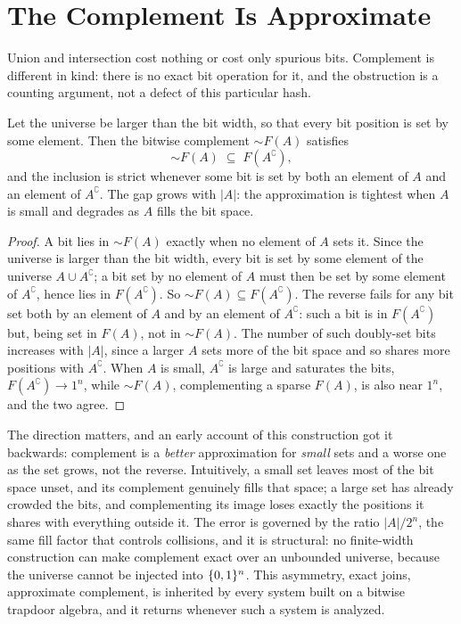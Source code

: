 \section{The Complement Is Approximate}
\label{sec:complement-approximate}

Union and intersection cost nothing or cost only spurious bits. Complement
is different in kind: there is no exact bit operation for it, and the
obstruction is a counting argument, not a defect of this particular hash.

\begin{theorem}
\label{thm:not-approximate}
Let the universe be larger than the bit width, so that every bit position is
set by some element. Then the bitwise complement ${\sim}F(A)$ satisfies
\[
  {\sim}F(A) \;\subseteq\; F(A^{\complement}),
\]
and the inclusion is strict whenever some bit is set by both an element of
$A$ and an element of $A^{\complement}$. The gap grows with $\lvert A\rvert$:
the approximation is tightest when $A$ is small and degrades as $A$ fills
the bit space.
\end{theorem}

\begin{proof}
A bit lies in ${\sim}F(A)$ exactly when no element of $A$ sets it. Since the
universe is larger than the bit width, every bit is set by some element of
the universe $A \cup A^{\complement}$; a bit set by no element of $A$ must
then be set by some element of $A^{\complement}$, hence lies in
$F(A^{\complement})$. So ${\sim}F(A) \subseteq F(A^{\complement})$. The
reverse fails for any bit set both by an element of $A$ and by an element of
$A^{\complement}$: such a bit is in $F(A^{\complement})$ but, being set in
$F(A)$, not in ${\sim}F(A)$. The number of such doubly-set bits increases
with $\lvert A\rvert$, since a larger $A$ sets more of the bit space and so
shares more positions with $A^{\complement}$. When $A$ is small,
$A^{\complement}$ is large and saturates the bits, $F(A^{\complement})
\to 1^n$, while ${\sim}F(A)$, complementing a sparse $F(A)$, is also near
$1^n$, and the two agree.
\end{proof}

The direction matters, and an early account of this construction got it
backwards: complement is a \emph{better} approximation for \emph{small} sets
and a worse one as the set grows, not the reverse. Intuitively, a small set
leaves most of the bit space unset, and its complement genuinely fills that
space; a large set has already crowded the bits, and complementing its image
loses exactly the positions it shares with everything outside it. The error
is governed by the ratio $\lvert A\rvert / 2^n$, the same fill factor that
controls collisions, and it is structural: no finite-width construction can
make complement exact over an unbounded universe, because the universe
cannot be injected into $\{0,1\}^n$. This asymmetry, exact joins, approximate
complement, is inherited by every system built on a bitwise trapdoor
algebra, and it returns whenever such a system is analyzed.

